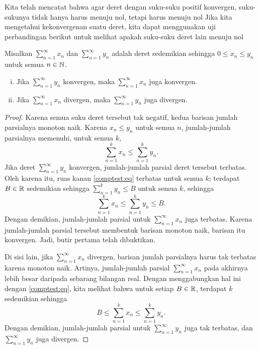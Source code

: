Kita telah mencatat bahwa agar deret dengan suku-suku positif konvergen,
suku-sukunya tidak hanya harus menuju nol, tetapi harus menuju nol
  Jika kita mengetahui kekonvergenan suatu deret,
kita dapat menggunakan uji perbandingan berikut untuk melihat apakah suku-suku deret
lain menuju nol 

\begin{samepage}
\begin{prop}
Misalkan $\sum_{n=1}^\infty x_n$ dan $\sum_{n=1}^\infty y_n$ adalah deret sedemikian sehingga $0 \leq x_n \leq y_n$
untuk semua $n \in {\mathbb{N}}$.
\begin{enumerate}[(i)]
\item Jika $\sum_{n=1}^\infty y_n$ konvergen, maka $\sum_{n=1}^\infty x_n$ juga konvergen.
\item Jika $\sum_{n=1}^\infty x_n$ divergen, maka $\sum_{n=1}^\infty y_n$ juga divergen.
\end{enumerate}
\end{prop}
\end{samepage}

\begin{proof}
Karena semua suku deret tersebut tak negatif, kedua barisan
jumlah parsialnya monoton naik.
Karena $x_n \leq y_n$ untuk semua $n$, jumlah-jumlah parsialnya
memenuhi, untuk semua $k$,
\begin{equation} \label{comptest:eq}
\sum_{n=1}^k x_n \leq \sum_{n=1}^k y_n .
\end{equation}
Jika deret $\sum_{n=1}^\infty y_n$ konvergen, jumlah-jumlah parsial deret tersebut
terbatas.  Oleh karena itu, ruas kanan \eqref{comptest:eq}
terbatas untuk semua $k$; terdapat $B \in {\mathbb{R}}$ sedemikian sehingga
$\sum_{n=1}^k y_n \leq B$ untuk semua $k$, sehingga
\begin{equation*}
\sum_{n=1}^k x_n \leq \sum_{n=1}^k y_n \leq B.
\end{equation*}
Dengan demikian, jumlah-jumlah parsial untuk $\sum_{n=1}^\infty x_n$
juga terbatas.  Karena jumlah-jumlah parsial tersebut membentuk barisan monoton naik,
barisan itu konvergen.  Jadi, butir pertama telah dibuktikan.

Di sisi lain, jika $\sum_{n=1}^\infty x_n$ divergen, barisan jumlah parsialnya
harus tak terbatas karena monoton naik.  Artinya, jumlah-jumlah parsial
$\sum_{n=1}^\infty x_n$ pada akhirnya lebih besar daripada sebarang bilangan real.  Dengan menggabungkan hal ini
dengan \eqref{comptest:eq}, kita melihat bahwa untuk setiap $B \in
{\mathbb{R}}$, terdapat $k$ sedemikian sehingga 
\begin{equation*}
B \leq \sum_{n=1}^k x_n \leq \sum_{n=1}^k y_n .
\end{equation*}
Dengan demikian, jumlah-jumlah parsial untuk $\sum_{n=1}^\infty y_n$ juga tak terbatas, dan
$\sum_{n=1}^\infty y_n$ juga divergen.
\end{proof}


